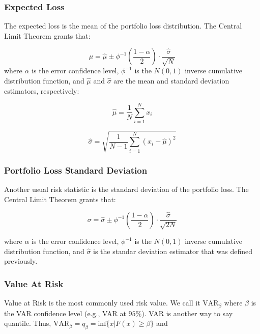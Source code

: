 \documentclass[a4paper,12pt,final]{article}
\begin{document}
\subsubsection{Expected Loss}
The expected loss is the mean of the portfolio loss distribution.
The Central Limit Theorem \cite{stats:schaum} grants that:

\begin{displaymath}
\mu = \widehat{\mu} \pm \phi^{-1}\left(\frac{1-\alpha}{2}\right) \cdot \frac{\widehat{\sigma}}{\sqrt{N}}
\end{displaymath}
where $\alpha$ is the error confidence level, $\phi^{-1}$ is the $N(0,1)$ inverse 
cumulative distribution function, and $\widehat{\mu}$ and $\widehat{\sigma}$ are 
the mean and standard deviation estimators, respectively:

\begin{displaymath}
\widehat{\mu} = \frac{1}{N} \sum_{i=1}^{N} x_i
\end{displaymath}

\begin{displaymath}
\widehat{\sigma} =
\sqrt{\frac{1}{N-1} \sum_{i=1}^{N} \left( x_i - \widehat{\mu} \right)^2}
\end{displaymath}

\subsubsection{Portfolio Loss Standard Deviation}
Another usual risk statistic is the standard deviation of the portfolio loss.
The Central Limit Theorem \cite{stats:schaum} grants that:

\begin{displaymath}
\sigma = \widehat{\sigma} \pm \phi^{-1}\left(\frac{1-\alpha}{2}\right) \cdot \frac{\widehat{\sigma}}{\sqrt{2N}}
\end{displaymath}

where $\alpha$ is the error confidence level, $\phi^{-1}$ is the $N(0,1)$ inverse 
cumulative distribution function, and $\widehat{\sigma}$ is the standar deviation 
estimator that was defined previously.

\subsubsection{Value At Risk}
Value at Risk \cite{var:jorion} is the most commonly used risk value. We call it 
$\textrm{VAR}_{\beta}$ where $\beta$ is the VAR confidence level (e.g., VAR at $95\%$).
VAR is another way to say quantile. Thus,
$\textrm{VAR}_{\beta} = q_{\beta} = \textrm{inf}\{x | F(x) \geq \beta \}$ and
\end{document}
